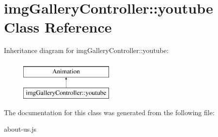 \hypertarget{classimgGalleryController_1_1youtube}{\section{img\-Gallery\-Controller\-:\-:youtube Class Reference}
\label{classimgGalleryController_1_1youtube}
}
Inheritance diagram for img\-Gallery\-Controller\-:\-:youtube\-:\begin{figure}[H]
\begin{center}
\leavevmode
\includegraphics[height=2.000000cm]{classimgGalleryController_1_1youtube}
\end{center}
\end{figure}


The documentation for this class was generated from the following file\-:\begin{DoxyCompactItemize}
\item 
about-\/us.\-js\end{DoxyCompactItemize}
